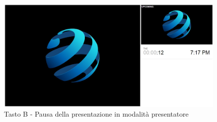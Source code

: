 \begin{itemize}
	\begin{figure}[H] 
		\centering 
		\includegraphics[scale=0.30] {img/b1}
		\caption{Tasto B - Pausa della presentazione in modalità presentatore} 
	\end{figure}
\end{itemize}
